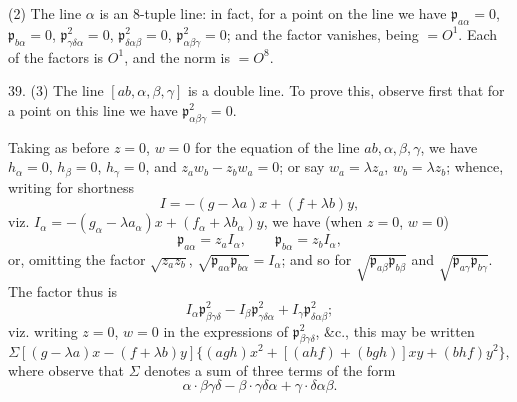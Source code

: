 \documentclass[11pt,a4paper]{article}
\newcommand{\p}{\mathfrak p}
\newcommand{\surf}[1]{\par\smallskip\noindent{\itshape \{Surface $#1$.\}}\par\smallskip}
\begin{document}
(2) The line $\alpha$ is an 8-tuple line: in fact, for a point on the line we have
$\p_{a\alpha}=0$, $\p_{b\alpha}=0$, $\p^2_{\gamma\delta\alpha}=0$,
$\p^2_{\delta\alpha\beta}=0$, $\p^2_{\alpha\beta\gamma}=0$; and the factor vanishes,
being $=O^1$. Each of the factors is $O^1$, and the norm is $=O^8$.

39. (3) The line $[ab,\alpha,\beta,\gamma]$ is a double line. To prove this, observe
first that for a point on this line we have $\p^2_{\alpha\beta\gamma}=0$.

Taking as before $z=0$, $w=0$ for the equation of the line $ab,\alpha,\beta,\gamma$,
we have $h_\alpha=0$, $h_\beta=0$, $h_\gamma=0$, and $z_aw_b-z_bw_a=0$; or say
$w_a=\lambda z_a$, $w_b=\lambda z_b$; whence, writing for shortness
\[
I=-(g-\lambda a)x+(f+\lambda b)y,
\]
viz.
$I_\alpha=-(g_\alpha-\lambda a_\alpha)x+(f_\alpha+\lambda b_\alpha)y$, we have
(when $z=0$, $w=0$)
\[
\p_{a\alpha}=z_aI_\alpha,\qquad \p_{b\alpha}=z_bI_\alpha,
\]
or, omitting the factor $\sqrt{z_az_b}$,
$\sqrt{\p_{a\alpha}\p_{b\alpha}}=I_\alpha$; and so for
$\sqrt{\p_{a\beta}\p_{b\beta}}$ and $\sqrt{\p_{a\gamma}\p_{b\gamma}}$. The factor
thus is
\[
I_\alpha\p^2_{\beta\gamma\delta}
-I_\beta\p^2_{\gamma\delta\alpha}
+I_\gamma\p^2_{\delta\alpha\beta};
\]
viz. writing $z=0$, $w=0$ in the expressions of $\p^2_{\beta\gamma\delta}$, \&c.,
this may be written
\[
\Sigma[(g-\lambda a)x-(f+\lambda b)y]
\{(agh)x^2+[(ahf)+(bgh)]xy+(bhf)y^2\},
\]
where observe that $\Sigma$ denotes a sum of three terms of the form
\[
\alpha\cdot\beta\gamma\delta-\beta\cdot\gamma\delta\alpha
+\gamma\cdot\delta\alpha\beta.
\]
\surf{abcd\alpha\beta}
\end{document}
